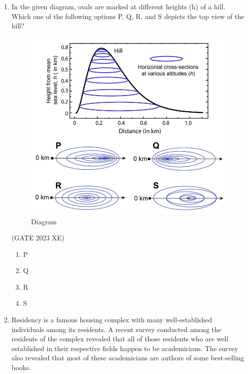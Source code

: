 \documentclass[journal,12pt,onecolumn]{IEEEtran}
\begin{document}
\begin{enumerate}
\item In the given diagram, ovals are marked at different heights (h) of a hill. Which one 
of the following options P, Q, R, and S depicts the top view of the hill?

\begin{figure}[htbp]

\centering

\includegraphics[width=.7\columnwidth]{figs/GA/fig1.png}

\caption{Diagram}

\label{fig:figs/GA/fig1.png}

\end{figure}

\hfill{(GATE 2023 XE)}

\begin{multicols}{4}

\begin{enumerate}

\item P

\item Q

\item R

\item S

\end{enumerate}

\end{multicols}

\item Residency is a famous housing complex with many well-established individuals 
among its residents. A recent survey conducted among the residents of the 
complex revealed that all of those residents who are well established in their 
respective fields happen to be academicians. The survey also revealed that most of 
these academicians are authors of some best-selling books. 
 

\end{enumerate}
\end{document}
